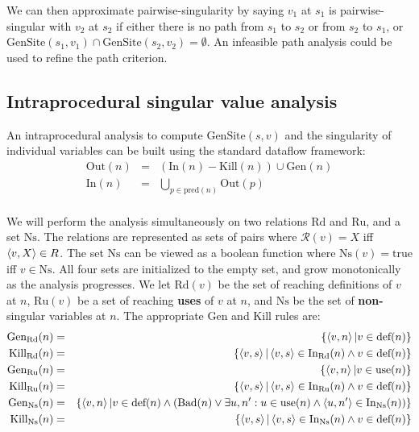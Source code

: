 \documentclass[11pt,notitlepage]{article}
\begin{document}
We can then approximate pairwise-singularity by saying $v_1$ at $s_1$
is pairwise-singular with $v_2$ at $s_2$ if either
there is no path from $s_1$ to $s_2$ or from $s_2$ to $s_1$, or
$\text{GenSite}(s_1,v_1) \cap \text{GenSite}(s_2,v_2) = \emptyset $.
An infeasible path analysis \cite{267921} could be used to refine
the path criterion.

\subsection{Intraprocedural singular value analysis}

An intraprocedural analysis to compute $\text{GenSite}(s, v)$ and the
singularity of individual variables can be built using the standard
dataflow framework:
\begin{eqnarray*}
\text{Out}(n)&=&\left(\text{In}(n)-\text{Kill}(n)\right)\cup\text{Gen}(n) \\
\text{In}(n)&=&\bigcup_{p\in\text{pred}(n)} \text{Out}(p)\\
\end{eqnarray*}

We will perform the analysis simultaneously on two relations 
$\text{Rd}$ and $\text{Ru}$, and a set $\text{Ns}$.
The relations are represented as
sets of pairs  where
$\mathcal{R}(v)=X$ iff $\left\langle v,X \right\rangle \in R$.
The set $\text{Ns}$ can be viewed as a boolean function where
$\text{Ns}(v)=\text{true}$ iff $v \in \text{Ns}$.
All four sets are initialized
to the empty set, and grow monotonically as the analysis
progresses.
We let
$\text{Rd}(v)$ be the set of reaching definitions of $v$ at $n$,
$\text{Ru}(v)$ be a set of reaching \textbf{uses} of $v$ at $n$,
 and
$\text{Ns}$ be the set of \textbf{non-}singular variables at $n$.
The appropriate Gen and Kill rules are:
\begin{eqnarray*}
\text{Gen}_\text{Rd}(n) &=&
	\{ \tuple{v, n} | v \in \text{def}(n) \} \\
\text{Kill}_\text{Rd}(n) &=&
	\{ \tuple{v, s} | \tuple{v,s} \in \text{In}_\text{Rd}(n) \wedge
                          v \in \text{def}(n) \} \\
%
\text{Gen}_\text{Ru}(n) &=&
	\{ \tuple{v, n} | v \in \text{use}(n) \} \\
\text{Kill}_\text{Ru}(n) &=&
	\{ \tuple{v, s} | \tuple{v,s} \in \text{In}_\text{Ru}(n) \wedge
                          v \in \text{def}(n) \} \\
%
\text{Gen}_\text{Ns}(n) &=&
	\left\{ \tuple{v, n} | v \in \text{def}(n) \wedge
\left( \text{Bad}(n) \vee \exists u,n':u\in\text{use}(n) \wedge
	\tuple{u,n'}\in \text{In}_\text{Ns}(n) \right) \right\}
\\
\text{Kill}_\text{Ns}(n) &=&
	\{ \tuple{v, s} | \tuple{v,s} \in \text{In}_\text{Ns}(n) \wedge
                          v \in \text{def}(n) \} \\
\end{eqnarray*}
\end{document}
